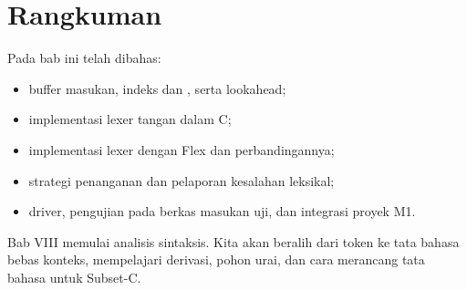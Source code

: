 \section*{Rangkuman}

Pada bab ini telah dibahas:
\begin{itemize}[leftmargin=*]
  \item buffer masukan, indeks  dan , serta
        lookahead;
  \item implementasi lexer tangan dalam C;
  \item implementasi lexer dengan Flex dan perbandingannya;
  \item strategi penanganan dan pelaporan kesalahan leksikal;
  \item driver, pengujian pada berkas masukan uji, dan integrasi
        proyek M1.
\end{itemize}

Bab VIII memulai analisis sintaksis. Kita akan beralih dari token ke
tata bahasa bebas konteks, mempelajari derivasi, pohon urai, dan cara
merancang tata bahasa untuk Subset-C.
